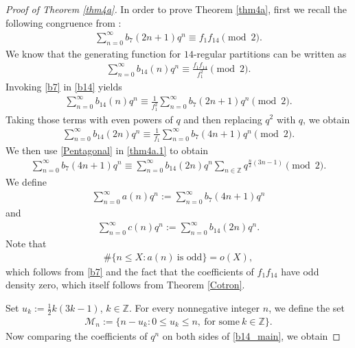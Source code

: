 \documentclass[reqno]{amsart}
\theoremstyle{definition}
\theoremstyle{remark}
\numberwithin{equation}{section}
\begin{document}
\begin{proof}[Proof of Theorem \ref{thm4a}] 
In order to prove Theorem \ref{thm4a}, first we recall the following congruence from \cite[(3.4)]{baruahdas}:
\begin{align}\label{b7}
\sum_{n=0}^{\infty}b_7(2n+1)q^{n}\equiv f_1f_{14}\pmod{2}.
\end{align}
We know that the generating function for $14$-regular partitions can be written as
\begin{align}\label{b14}
\sum_{n=0}^{\infty}b_{14}(n)q^n\equiv \frac{f_1f_{14}}{f^2_{1}}\pmod{2}.
\end{align}
Invoking \eqref{b7} in \eqref{b14} yields
\begin{align*}
\sum_{n=0}^{\infty}b_{14}(n)q^{n}\equiv\frac{1}{f^2_1}\sum_{n=0}^{\infty}b_7(2n+1)q^{n}\pmod{2}.
\end{align*}
Taking those terms with even powers of $q$ and then replacing $q^2$ with $q$, we obtain
\begin{align}\label{thm4a.1}
\sum_{n=0}^{\infty}b_{14}(2n)q^{n}\equiv\frac{1}{f_1}\sum_{n=0}^{\infty}b_7(4n+1)q^{n}\pmod{2}.
\end{align}
We then use \eqref{Pentagonal} in \eqref{thm4a.1} to obtain 
\begin{align}\label{b14_main}
\sum_{n=0}^{\infty}b_7(4n+1)q^{n}\equiv \sum_{n=0}^{\infty}b_{14}(2n)q^{n}\sum_{n\in \mathbb{Z}}q^{\frac{n}{2}(3n-1)}\pmod{2}.
\end{align}
We define
\begin{align}\label{b14_an}
\sum_{n=0}^{\infty}a(n)q^n:=\sum_{n=0}^{\infty}b_7(4n+1)q^n
\end{align}
and
\begin{align}\label{b14_2n_define}
\sum_{n=0}^{\infty}c(n)q^n:=\sum_{n=0}^{\infty}b_{14}(2n)q^n.
\end{align}
Note that
\begin{align}\label{b14-ox}
\#\{n\leq X: a(n)\ \text{is odd}\}=o(X),
\end{align}
which follows from \eqref{b7} and the fact that the coefficients of $f_1f_{14}$ have odd density zero, which itself follows from Theorem \ref{Cotron}.
\par Set $u_k:=\frac{1}{2}k(3k-1)$, $k\in \mathbb{Z}$. For every nonnegative integer $n$, we define the set
\begin{align*}
\mathcal{M}_n:=\{n-u_k: 0\leq u_k\leq n,\ \text{for some}\ k\in \mathbb{Z}\}.
\end{align*}
Now comparing the coefficients of $q^{n}$ on both sides of \eqref{b14_main}, we obtain

\end{proof}
\end{document}
